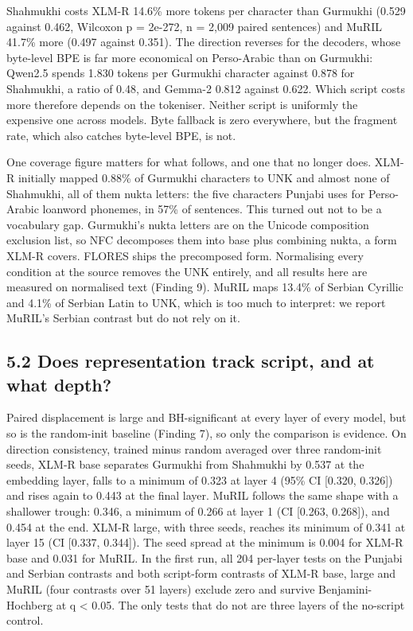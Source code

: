 Shahmukhi costs XLM-R 14.6\% more tokens per character than Gurmukhi
(0.529 against 0.462, Wilcoxon p = 2e-272, n = 2,009 paired sentences)
and MuRIL 41.7\% more (0.497 against 0.351). The direction reverses for
the decoders, whose byte-level BPE is far more economical on
Perso-Arabic than on Gurmukhi: Qwen2.5 spends 1.830 tokens per Gurmukhi
character against 0.878 for Shahmukhi, a ratio of 0.48, and Gemma-2
0.812 against 0.622. Which script costs more therefore depends on the
tokeniser. Neither script is uniformly the expensive one across models.
Byte fallback is zero everywhere, but the fragment rate, which also
catches byte-level BPE, is not.

One coverage figure matters for what follows, and one that no longer
does. XLM-R initially mapped 0.88\% of Gurmukhi characters to UNK and
almost none of Shahmukhi, all of them nukta letters: the five characters
Punjabi uses for Perso-Arabic loanword phonemes, in 57\% of sentences.
This turned out not to be a vocabulary gap. Gurmukhi's nukta letters are
on the Unicode composition exclusion list, so NFC decomposes them into
base plus combining nukta, a form XLM-R covers. FLORES ships the
precomposed form. Normalising every condition at the source removes the
UNK entirely, and all results here are measured on normalised text
(Finding 9). MuRIL maps 13.4\% of Serbian Cyrillic and 4.1\% of Serbian
Latin to UNK, which is too much to interpret: we report MuRIL's Serbian
contrast but do not rely on it.

\hypertarget{does-representation-track-script-and-at-what-depth}{%
\subsection{5.2 Does representation track script, and at what
depth?}\label{does-representation-track-script-and-at-what-depth}}

Paired displacement is large and BH-significant at every layer of every
model, but so is the random-init baseline (Finding 7), so only the
comparison is evidence. On direction consistency, trained minus random
averaged over three random-init seeds, XLM-R base separates Gurmukhi
from Shahmukhi by 0.537 at the embedding layer, falls to a minimum of
0.323 at layer 4 (95\% CI {[}0.320, 0.326{]}) and rises again to 0.443
at the final layer. MuRIL follows the same shape with a shallower
trough: 0.346, a minimum of 0.266 at layer 1 (CI {[}0.263, 0.268{]}),
and 0.454 at the end. XLM-R large, with three seeds, reaches its minimum
of 0.341 at layer 15 (CI {[}0.337, 0.344{]}). The seed spread at the
minimum is 0.004 for XLM-R base and 0.031 for MuRIL. In the first run,
all 204 per-layer tests on the Punjabi and Serbian contrasts and both
script-form contrasts of XLM-R base, large and MuRIL (four contrasts
over 51 layers) exclude zero and survive Benjamini-Hochberg at q
\textless{} 0.05. The only tests that do not are three layers of the
no-script control.

